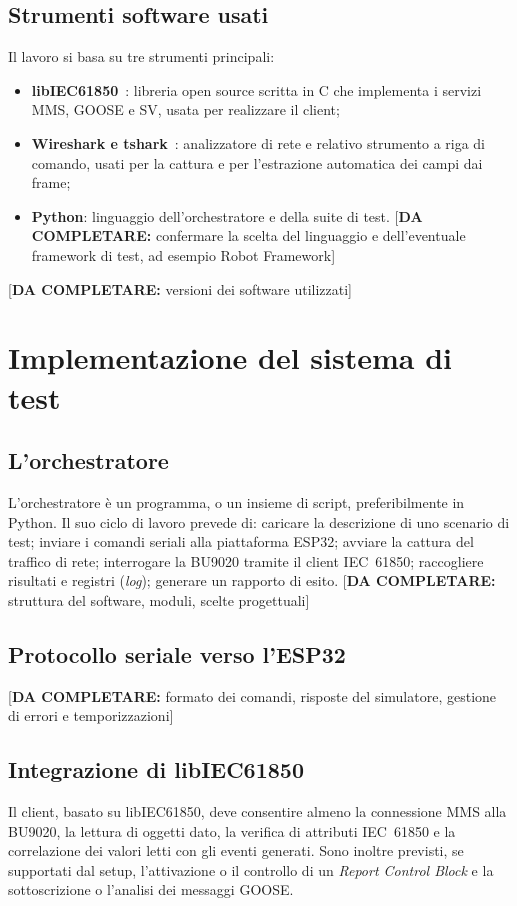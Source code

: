 \documentclass[11pt,a4paper,italian,oneside,openany]{book}
\newcommand{\daf}[1]{{\color{red}[\textbf{DA COMPLETARE:} #1]}}
\begin{document}
\section{Strumenti software usati}
Il lavoro si basa su tre strumenti principali:
\begin{itemize}
    \item \textbf{libIEC61850}~\cite{libiec61850}: libreria open source scritta in C che implementa i servizi MMS, GOOSE e SV, usata per realizzare il client;
    \item \textbf{Wireshark e tshark}~\cite{wireshark}: analizzatore di rete e relativo strumento a riga di comando, usati per la cattura e per l'estrazione automatica dei campi dai frame;
    \item \textbf{Python}: linguaggio dell'orchestratore e della suite di test. \daf{confermare la scelta del linguaggio e dell'eventuale framework di test, ad esempio Robot Framework}
\end{itemize}
\daf{versioni dei software utilizzati}

\chapter{Implementazione del sistema di test}\label{cap:implementazione}
\section{L'orchestratore}
L'orchestratore è un programma, o un insieme di script, preferibilmente in Python. Il suo ciclo di lavoro prevede di: caricare la descrizione di uno scenario di test; inviare i comandi seriali alla piattaforma ESP32; avviare la cattura del traffico di rete; interrogare la BU9020 tramite il client IEC~61850; raccogliere risultati e registri (\textit{log}); generare un rapporto di esito. \daf{struttura del software, moduli, scelte progettuali}

\section{Protocollo seriale verso l'ESP32}\label{sec:seriale}
\daf{formato dei comandi, risposte del simulatore, gestione di errori e temporizzazioni}

\section{Integrazione di libIEC61850}
Il client, basato su libIEC61850, deve consentire almeno la connessione MMS alla BU9020, la lettura di oggetti dato, la verifica di attributi IEC~61850 e la correlazione dei valori letti con gli eventi generati. Sono inoltre previsti, se supportati dal setup, l'attivazione o il controllo di un \textit{Report Control Block} e la sottoscrizione o l'analisi dei messaggi GOOSE.
\end{document}
